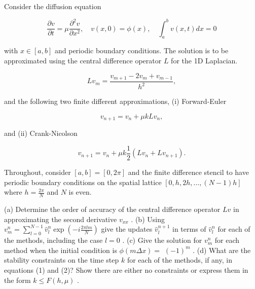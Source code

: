 \begin{exercise}
\label{applied:2024:6}
Consider the diffusion equation

\[
\frac {\partial v}{\partial t} = \mu \frac {\partial^ {2} v}{\partial x ^ {2}}, \quad v (x, 0) = \phi (x), \quad \int_ {a} ^ {b} v (x, t) d x = 0
\]

with $x \in [ a , b ]$ and periodic boundary conditions. The solution is to be approximated using the central difference operator $L$ for the 1D Laplacian.

\[
L v _ {m} = \frac {v _ {m + 1} - 2 v _ {m} + v _ {m - 1}}{h ^ {2}},
\]

and the following two finite different approximations, (i) Forward-Euler

\[
v _ {n + 1} = v _ {n} + \mu k L v _ {n}, \tag {1}
\]

and (ii) Crank-Nicolson

\[
v _ {n + 1} = v _ {n} + \mu k \frac{1}{2} \left(L v _ {n} + L v _ {n + 1}\right). \tag {2}
\]

Throughout, consider $[ a , b ] = [ 0 , 2 \pi ]$ and the finite difference stencil to have periodic boundary conditions on the spatial lattice $[ 0 , h , 2 h , \ldots , ( N - 1 ) h ]$ where $h = { \frac { 2 \pi } { N } }$ and $N$ is even.

(a) Determine the order of accuracy of the central difference operator $\mathit { L v }$ in approximating the second derivative $v _ { x x }$ .   
(b) Using $v _ { m } ^ { n } = \sum _ { l = 0 } ^ { N - 1 } \hat { v } _ { l } ^ { n } \exp \left( - i \frac { 2 \pi l m } { N } \right)$ give the updates $\hat { v } _ { l } ^ { n + 1 }$ in terms of $\hat { v } _ { l } ^ { n }$ for each of the methods, including the case $l = 0$ .   
(c) Give the solution for $v _ { m } ^ { n }$ for each method when the initial condition is $\phi ( m \Delta x ) =$ $( - 1 ) ^ { m }$ .   
(d) What are the stability constraints on the time step $k$ for each of the methods, if any, in equations (1) and (2)? Show there are either no constraints or express them in the form $k \leq F ( h , \mu )$ .
\end{exercise}

